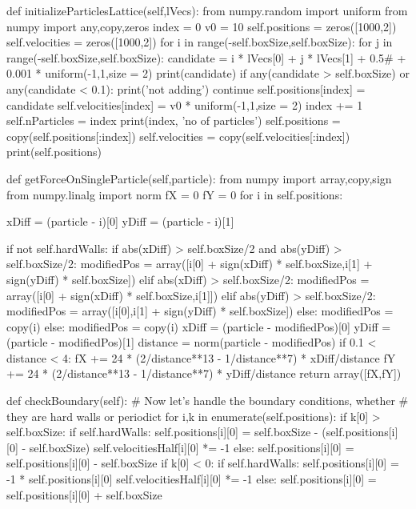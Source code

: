 \begin{codeexample}
\begin{VerbatimOut}{\listingFile}
    def initializeParticlesLattice(self,lVecs):
        from numpy.random import uniform
        from numpy import any,copy,zeros
        index = 0
        v0 = 10
        self.positions = zeros([1000,2])
        self.velocities = zeros([1000,2])
        for i in range(-self.boxSize,self.boxSize):
            for j in range(-self.boxSize,self.boxSize):
                candidate = i * lVecs[0] + j * lVecs[1] + 0.5# + 0.001 * uniform(-1,1,size = 2)
                print(candidate)
                if any(candidate > self.boxSize) or any(candidate < 0.1):
                    print('not adding')
                    continue
                self.positions[index] = candidate
                self.velocities[index] = v0 * uniform(-1,1,size = 2)
                index += 1
        self.nParticles = index
        print(index, 'no of particles')
        self.positions = copy(self.positions[:index])
        self.velocities = copy(self.velocities[:index])
        print(self.positions)



    def getForceOnSingleParticle(self,particle):
        from numpy import array,copy,sign
        from numpy.linalg import norm
        fX = 0
        fY = 0
        for i in self.positions:

            xDiff = (particle - i)[0]
            yDiff = (particle - i)[1]

            if not self.hardWalls:
                if abs(xDiff) > self.boxSize/2 and abs(yDiff) > self.boxSize/2:
                    modifiedPos = array([i[0] + sign(xDiff) * self.boxSize,i[1] + sign(yDiff) * self.boxSize])
                elif abs(xDiff) > self.boxSize/2:
                    modifiedPos = array([i[0] + sign(xDiff) * self.boxSize,i[1]])
                elif abs(yDiff) > self.boxSize/2:
                    modifiedPos = array([i[0],i[1] + sign(yDiff) * self.boxSize])
                else:
                    modifiedPos = copy(i)
            else:
                modifiedPos = copy(i)
            xDiff = (particle - modifiedPos)[0]
            yDiff = (particle - modifiedPos)[1]
            distance = norm(particle - modifiedPos)
            if 0.1 < distance < 4:
                fX += 24 * (2/distance**13 - 1/distance**7) * xDiff/distance
                fY += 24 * (2/distance**13 - 1/distance**7) * yDiff/distance
        return array([fX,fY])


    def checkBoundary(self):
        # Now let's handle the boundary conditions, whether
        # they are hard walls or periodict
        for i,k in enumerate(self.positions):
            if k[0] > self.boxSize:
                if self.hardWalls:
                    self.positions[i][0] = self.boxSize - (self.positions[i][0] - self.boxSize)
                    self.velocitiesHalf[i][0] *= -1
                else:
                    self.positions[i][0] = self.positions[i][0] - self.boxSize
            if k[0] < 0:
                if self.hardWalls:
                    self.positions[i][0] = -1 * self.positions[i][0]
                    self.velocitiesHalf[i][0] *= -1
                else:
                    self.positions[i][0] = self.positions[i][0] + self.boxSize


\end{VerbatimOut}
\end{codeexample}
